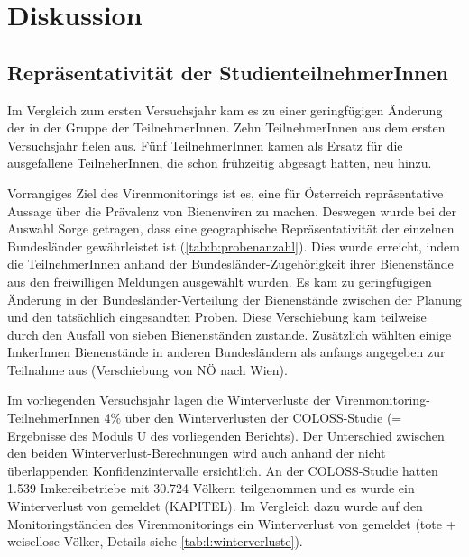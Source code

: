 \section{Diskussion}

\subsection{Repräsentativität der StudienteilnehmerInnen}

Im Vergleich zum ersten Versuchsjahr kam es zu einer geringfügigen Änderung der in der Gruppe der TeilnehmerInnen. Zehn TeilnehmerInnen aus dem ersten Versuchsjahr fielen aus. Fünf TeilnehmerInnen kamen als Ersatz für die ausgefallene TeilneherInnen, die schon frühzeitig abgesagt hatten, neu hinzu. 

Vorrangiges Ziel des Virenmonitorings ist es, eine für Österreich repräsentative Aussage über die Prävalenz von Bienenviren zu machen. Deswegen wurde bei der Auswahl Sorge getragen, dass eine geographische Repräsentativität der einzelnen Bundesländer gewährleistet ist (\cref{tab:b:probenanzahl}). Dies wurde erreicht, indem die TeilnehmerInnen anhand der Bundesländer-Zugehörigkeit ihrer Bienenstände aus den freiwilligen Meldungen ausgewählt wurden. Es kam zu geringfügigen Änderung in der Bundesländer-Verteilung der Bienenstände zwischen der Planung und den tatsächlich eingesandten Proben. Diese Verschiebung kam teilweise durch den Ausfall von sieben Bienenständen zustande. Zusätzlich wählten einige ImkerInnen Bienenstände in anderen Bundesländern als anfangs angegeben zur Teilnahme aus (Verschiebung von NÖ nach Wien).

Im vorliegenden Versuchsjahr lagen die Winterverluste der Virenmonitoring-TeilnehmerInnen 4\% über den Winterverlusten der COLOSS-Studie (= Ergebnisse des Moduls U des vorliegenden Berichts). Der Unterschied zwischen den beiden Winterverlust-Berechnungen wird auch anhand der nicht überlappenden Konfidenzintervalle ersichtlich. An der COLOSS-Studie hatten 1.539 Imkereibetriebe mit 30.724 Völkern teilgenommen und es wurde ein Winterverlust von  gemeldet (KAPITEL). Im Vergleich dazu wurde auf den Monitoringständen des Virenmonitorings ein Winterverlust von  gemeldet (tote + weisellose Völker, Details siehe \cref{tab:l:winterverluste}).

